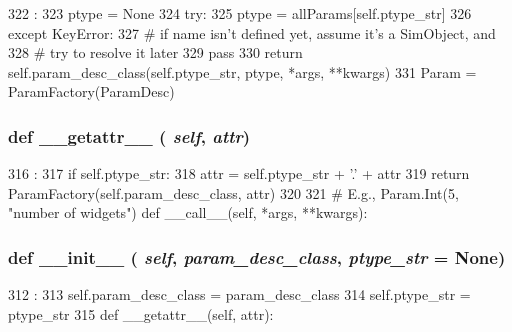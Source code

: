 \begin{DoxyCode}
322                                        :
323         ptype = None
324         try:
325             ptype = allParams[self.ptype_str]
326         except KeyError:
327             # if name isn't defined yet, assume it's a SimObject, and
328             # try to resolve it later
329             pass
330         return self.param_desc_class(self.ptype_str, ptype, *args, **kwargs)
331 
Param = ParamFactory(ParamDesc)
\end{DoxyCode}
\hypertarget{classm5_1_1params_1_1ParamFactory_a0a990b3ec3889d40889daca9ee5e4695}{
\subsubsection[{\_\-\_\-getattr\_\-\_\-}]{\setlength{\rightskip}{0pt plus 5cm}def \_\-\_\-getattr\_\-\_\- ( {\em self}, \/   {\em attr})}}
\label{classm5_1_1params_1_1ParamFactory_a0a990b3ec3889d40889daca9ee5e4695}



\begin{DoxyCode}
316                                :
317         if self.ptype_str:
318             attr = self.ptype_str + '.' + attr
319         return ParamFactory(self.param_desc_class, attr)
320 
321     # E.g., Param.Int(5, "number of widgets")
    def __call__(self, *args, **kwargs):
\end{DoxyCode}
\hypertarget{classm5_1_1params_1_1ParamFactory_ac775ee34451fdfa742b318538164070e}{
\subsubsection[{\_\-\_\-init\_\-\_\-}]{\setlength{\rightskip}{0pt plus 5cm}def \_\-\_\-init\_\-\_\- ( {\em self}, \/   {\em param\_\-desc\_\-class}, \/   {\em ptype\_\-str} = {\ttfamily None})}}
\label{classm5_1_1params_1_1ParamFactory_ac775ee34451fdfa742b318538164070e}



\begin{DoxyCode}
312                                                           :
313         self.param_desc_class = param_desc_class
314         self.ptype_str = ptype_str
315 
    def __getattr__(self, attr):
\end{DoxyCode}


